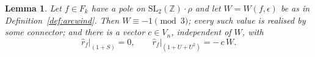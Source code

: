 \documentclass[11pt]{article}
\newtheorem{lemma}[theorem]{Lemma}
\newcommand{\ZZ}{\mathbb{Z}}
\newcommand{\SLZ}{\mathrm{SL}_2(\ZZ)}
\begin{document}
%

\begin{lemma}\label{lem:arcwind}
Let $f\in F_k$ have a pole on $\SLZ\!\cdot\!\rho$ and let $W=W(f,\epsilon)$ be as in
Definition~\ref{def:arcwind}. Then $W\equiv-1\pmod3$; every such value is realised by some
connector; and there is a vector $c\in V_n$, independent of $W$, with
\begin{equation}\label{eq:arcwind}
\hat r_f\big|_{(1+S)}=0,\qquad \hat r_f\big|_{(1+U+U^2)}=-\,c\,W .
\end{equation}
\end{lemma}
\end{document}
